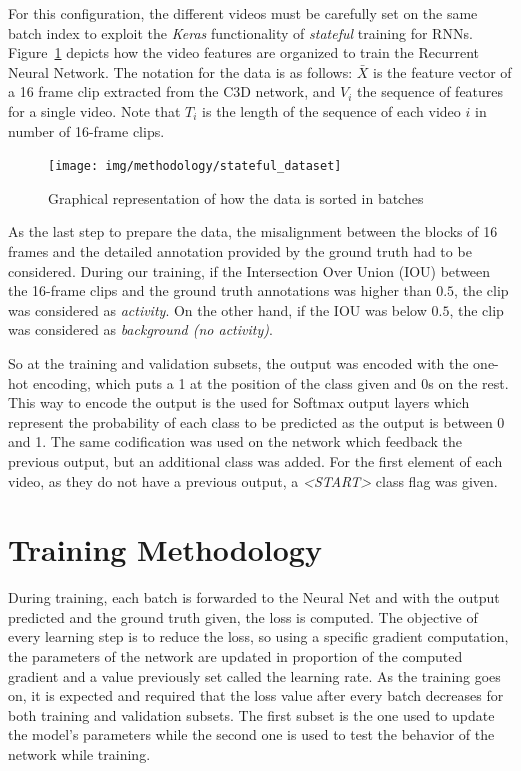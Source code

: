 For this configuration, the different videos must be carefully set on the same batch index to exploit the \textit{Keras} functionality of \textit{stateful} training for RNNs. Figure~\ref{fig:stateful_dataset} depicts how the video features are organized to train the Recurrent Neural Network. The notation for the data is as follows: $\bar{X}$ is the feature vector of a 16 frame clip extracted from the C3D network, and $V_i$ the sequence of features for a single video. Note that $T_i$ is the length of the sequence of each video $i$ in number of 16-frame clips.

\begin{figure}[ht]
\begin{center}
\texttt{[image: img/methodology/stateful\_dataset]}
\end{center}
\caption{Graphical representation of how the data is sorted in batches}
\label{fig:stateful_dataset}
\end{figure}

As the last step to prepare the data, the misalignment between the blocks of 16 frames and the detailed annotation provided by the ground truth had to be considered. During our training, if the Intersection Over Union (IOU) between the 16-frame clips and the ground truth annotations was higher than $0.5$, the clip was considered as \textit{activity}. On the other hand, if the IOU was below $0.5$, the clip was considered as \textit{background (no activity)}.

So at the training and validation subsets, the output was encoded with the one-hot encoding, which puts a 1 at the position of the class given and 0s on the rest.  This way to encode the output is the used for Softmax output layers which represent the probability of each class to be predicted as the output is between 0 and 1. The same codification was used on the network which feedback the previous output, but an additional class was added. For the first element of each video, as they do not have a previous output, a \textit{\textless START\textgreater} class flag was given.

\section{Training Methodology}
\label{section:training}

During training, each batch is forwarded to the Neural Net and with the output predicted and the ground truth given, the loss is computed. The objective of every learning step is to reduce the loss, so using a specific gradient computation, the parameters of the network are updated in proportion of the computed gradient and a value previously set called the learning rate. As the training goes on, it is expected and required that the loss value after every batch decreases for both training and validation subsets. The first subset is the one used to update the model's parameters while the second one is used to test the behavior of the network while training.

